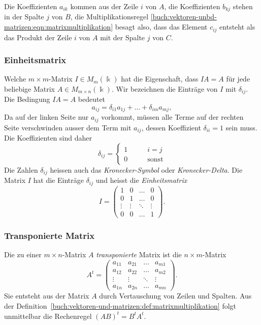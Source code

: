 Die Koeffizienten $a_{ik}$ kommen aus der Zeile $i$ von $A$, die Koeffizienten
$b_{k\!j}$ stehen in der Spalte $j$ von $B$, die Multiplikationsregel
\eqref{buch:vektoren-unbd-matrizen:eqn:matrixmultiplikation}
besagt also, dass das Element $c_{i\!j}$ entsteht als das Produkt
der Zeile $i$ von $A$ mit der Spalte $j$ von $C$.

\subsubsection{Einheitsmatrix}
Welche $m\times m$-Matrix $I\in M_{m}(\Bbbk)$ hat die Eigenschaft, dass
$IA=A$ für jede beliebige Matrix $A\in M_{m\times n}(\Bbbk)$.
Wir bezeichnen die Einträge von $I$ mit $\delta_{i\!j}$.
Die Bedingung $IA=A$ bedeutet
\[
a_{i\!j} = \delta_{i1}a_{1j} + \dots + \delta_{im}a_{mj},
\]
Da auf der linken Seite nur $a_{i\!j}$ vorkommt, müssen alle Terme auf der
rechten Seite verschwinden ausser dem Term mit $a_{i\!j}$, dessen
Koeffizient $\delta_{ii}=1$ sein muss.
Die Koeffizienten sind daher
\[
\delta_{i\!j}
=
\begin{cases}
1&\qquad i=j\\
0&\qquad\text{sonst}
\end{cases}
\]
Die Zahlen $\delta_{i\!j}$ heissen auch das {\em Kronecker-Symbol} oder
{\em Kronecker-Delta}.
%
%
Die Matrix $I$ hat die Einträge $\delta_{i\!j}$ und heisst die
{\em Einheitsmatrix}
%
\[
I
=
\begin{pmatrix}
1     &0     &\dots &0     \\
0     &1     &\dots &0     \\[-2pt]
\vdots&\vdots&\ddots&\vdots\\
0     &0     &\dots &1
\end{pmatrix}.
\]

\subsubsection{Transponierte Matrix}
%
%
Die zu einer $m\times n$-Matrix $A$ {\em transponierte} Matrix ist die
$n\times m$-Matrix
\[
A^t=\begin{pmatrix}
a_{11}&a_{21}&\dots&a_{m1}\\
a_{12}&a_{22}&\dots&a_{m2}\\
\vdots&\vdots&\ddots&\vdots\\
a_{1n}&a_{2n}&\dots&a_{mn}
\end{pmatrix}.
\]
Sie entsteht aus der Matrix $A$ durch Vertauschung von Zeilen und Spalten.
Aus der Definition~\ref{buch:vektoren-und-matrizen:def:matrixmultiplikation}
folgt unmittelbar die Rechenregel $(AB)^t = B^tA^t$.

